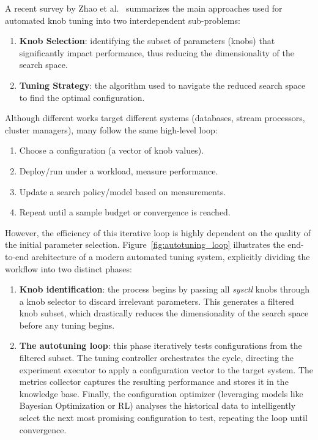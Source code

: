 A recent survey by Zhao et al.~\cite{autotune_survey} summarizes the main approaches used for automated knob tuning into two interdependent sub-problems:
\begin{enumerate}
    \item \textbf{Knob Selection}: identifying the subset of parameters (knobs) that significantly impact performance, thus reducing the dimensionality of the search space.
    \item \textbf{Tuning Strategy}: the algorithm used to navigate the reduced search space to find the optimal configuration.
\end{enumerate}

Although different works target different systems (databases, stream processors, cluster managers), many follow the same high-level loop:
\begin{enumerate}
    \item Choose a configuration (a vector of knob values).
    \item Deploy/run under a workload, measure performance.
    \item Update a search policy/model based on measurements.
    \item Repeat until a sample budget or convergence is reached.
\end{enumerate}

However, the efficiency of this iterative loop is highly dependent on the quality of the initial parameter selection.
Figure~\ref{fig:autotuning_loop} illustrates the end-to-end architecture of a modern automated tuning system, explicitly dividing the workflow into two distinct phases:
\begin{enumerate}
    \item \textbf{Knob identification}: the process begins by passing all \textit{sysctl} knobs through a knob selector to discard irrelevant parameters. This generates a filtered knob subset, which drastically reduces the dimensionality of the search space before any tuning begins.
    \item \textbf{The autotuning loop}: this phase iteratively tests configurations from the filtered subset. The tuning controller orchestrates the cycle, directing the experiment executor to apply a configuration vector to the target system. The metrics collector captures the resulting performance and stores it in the knowledge base. Finally, the configuration optimizer (leveraging models like Bayesian Optimization or RL) analyses the historical data to intelligently select the next most promising configuration to test, repeating the loop until convergence.
\end{enumerate}

